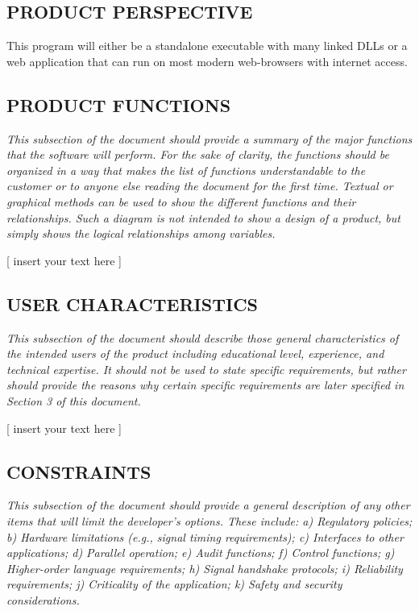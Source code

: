\documentclass[twoside,letterpaper]{article}
\begin{document}
\subsection[PRODUCT PERSPECTIVE]{\rmfamily\bfseries PRODUCT PERSPECTIVE}
\hypertarget{RefHeading17259017292}{}{
\foreignlanguage{english}{This program will either be a standalone executable with many linked DLLs or a web application that can run on most modern web-browsers with internet access.}}

{\color{black}
}

\subsection[PRODUCT FUNCTIONS]{\rmfamily\bfseries PRODUCT FUNCTIONS}
\hypertarget{RefHeading17459017292}{}{\itshape
This subsection of the document should provide a summary of the major
functions that the software will perform. For the sake of clarity, the
functions should be organized in a way that makes the list of
functions understandable to the customer or to anyone else reading
the document for the first time. Textual or graphical methods can
be used to show the different functions and their relationships.
Such a diagram is not intended to show a design of a product,
but simply shows the logical relationships among variables.}

[ insert your text here ]

\subsection[USER CHARACTERISTICS]{\rmfamily\bfseries USER CHARACTERISTICS}
\hypertarget{RefHeading17659017292}{}{\itshape
This subsection of the document should describe those general
characteristics of the intended users of the product including
educational level, experience, and technical expertise. It
should not be used to state specific
requirements, but rather should provide the reasons why certain
specific requirements are later specified in
Section 3 of this document.}

[ insert your text here ]

\subsection[CONSTRAINTS]{\rmfamily\bfseries CONSTRAINTS}
\hypertarget{RefHeading17859017292}{}{\itshape
This subsection of the document should provide a general description
of any other items that will limit the developer's options. These
include: a) Regulatory policies; b) Hardware limitations (e.g.,
signal timing requirements); c) Interfaces to other applications;
d) Parallel operation; e) Audit functions; f) Control functions;
g) Higher-order language requirements; h) Signal handshake
protocols; i) Reliability requirements; j) Criticality of the
application; k) Safety and security considerations.}
\end{document}
